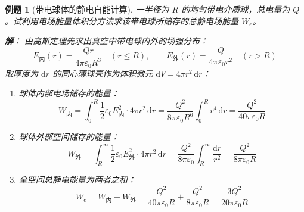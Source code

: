 \documentclass[11pt,a4paper,fontset=fandol]{ctexart}
\newtheorem{example}{例题}[section]
\theoremstyle{remark}
\begin{document}
\begin{example}[带电球体的静电自能计算]
一半径为 $R$ 的均匀带电介质球，总电量为 $Q$。试利用电场能量体积分方法求该带电球所储存的总静电场能量 $W_e$。

\begin{center}
\end{center}

\textbf{解}：
由高斯定理先求出真空中带电球内外的场强分布：
\begin{equation*}
    E_{\text{内}}(r) = \frac{Qr}{4\pi\varepsilon_0 R^3} \quad (r \le R), \qquad E_{\text{外}}(r) = \frac{Q}{4\pi\varepsilon_0 r^2} \quad (r > R)
\end{equation*}
取厚度为 $\mathrm{d}r$ 的同心薄球壳作为体积微元 $\mathrm{d}V = 4\pi r^2\,\mathrm{d}r$：
\begin{enumerate}
    \item 球体内部电场储存的能量：
    \begin{equation*}
        W_{\text{内}} = \int_0^R \frac{1}{2}\varepsilon_0 E_{\text{内}}^2 \cdot 4\pi r^2\,\mathrm{d}r = \frac{Q^2}{8\pi\varepsilon_0 R^6}\int_0^R r^4\,\mathrm{d}r = \frac{Q^2}{40\pi\varepsilon_0 R}
    \end{equation*}
    \item 球体外部空间储存的能量：
    \begin{equation*}
        W_{\text{外}} = \int_R^\infty \frac{1}{2}\varepsilon_0 E_{\text{外}}^2 \cdot 4\pi r^2\,\mathrm{d}r = \frac{Q^2}{8\pi\varepsilon_0}\int_R^\infty \frac{\mathrm{d}r}{r^2} = \frac{Q^2}{8\pi\varepsilon_0 R}
    \end{equation*}
    \item 全空间总静电能量为两者之和：
    \begin{equation*}
        W_e = W_{\text{内}} + W_{\text{外}} = \frac{Q^2}{40\pi\varepsilon_0 R} + \frac{Q^2}{8\pi\varepsilon_0 R} = \frac{3Q^2}{20\pi\varepsilon_0 R}
    \end{equation*}
\end{enumerate}
\end{example}
\end{document}
